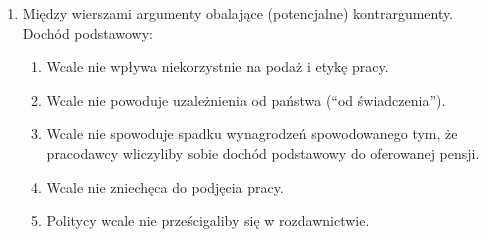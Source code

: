 \documentclass[11pt]{article}
\begin{document}
\begin{enumerate}
			\item Między wierszami argumenty obalające (potencjalne) kontrargumenty. Dochód podstawowy:
			\begin{enumerate}
				\item Wcale nie wpływa niekorzystnie na podaż i etykę pracy.
				\item Wcale nie powoduje uzależnienia od państwa (``od świadczenia'').
				\item Wcale nie spowoduje spadku wynagrodzeń spowodowanego tym, że pracodawcy wliczyliby sobie dochód podstawowy do oferowanej pensji.
				\item Wcale nie zniechęca do podjęcia pracy.
				\item Politycy wcale nie prześcigaliby się w rozdawnictwie.
			\end{enumerate}
		\end{enumerate}
	
\end{document}
